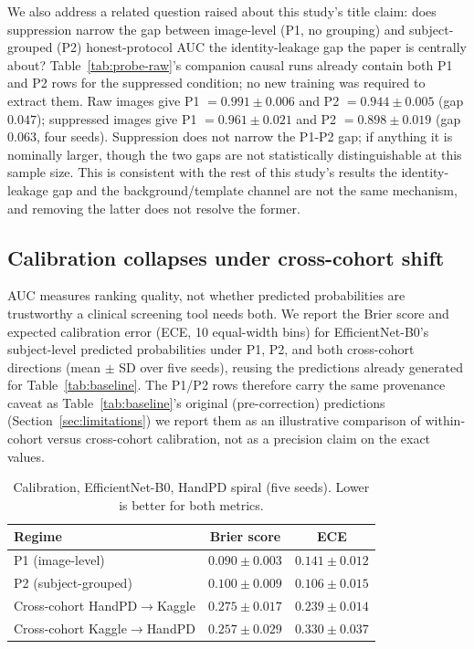 \documentclass[3p,final,10pt]{elsarticle}
\let\oldsubsection\subsection
\renewcommand{\subsection}{\FloatBarrier\oldsubsection}
\begin{document}
We also address a related question raised about this study's title claim:
does suppression narrow the gap between image-level (P1, no grouping) and
subject-grouped (P2) honest-protocol AUC the identity-leakage gap the
paper is centrally about? Table~\ref{tab:probe-raw}'s companion causal runs
already contain both P1 and P2 rows for the suppressed condition; no new
training was required to extract them. Raw images give P1 $=0.991\pm0.006$
and P2 $=0.944\pm0.005$ (gap $0.047$); suppressed images give P1
$=0.961\pm0.021$ and P2 $=0.898\pm0.019$ (gap $0.063$, four seeds).
Suppression does not narrow the P1-P2 gap; if anything it is nominally
larger, though the two gaps are not statistically distinguishable at this
sample size. This is consistent with the rest of this study's results the
identity-leakage gap and the background/template channel are not the same
mechanism, and removing the latter does not resolve the former.

\subsection{Calibration collapses under cross-cohort shift}
\label{sec:calibration}
AUC measures ranking quality, not whether predicted probabilities are
trustworthy a clinical screening tool needs both. We report the Brier
score and expected calibration error (ECE, 10 equal-width bins) for
EfficientNet-B0's subject-level predicted probabilities under P1, P2, and
both cross-cohort directions (mean $\pm$ SD over five seeds), reusing the
predictions already generated for Table~\ref{tab:baseline}. The P1/P2 rows
therefore carry the same provenance caveat as Table~\ref{tab:baseline}'s
original (pre-correction) predictions (Section~\ref{sec:limitations}) we
report them as an illustrative comparison of within-cohort versus
cross-cohort calibration, not as a precision claim on the exact values.

\begin{table}[H]
\centering
\caption{Calibration, EfficientNet-B0, HandPD spiral (five seeds). Lower
is better for both metrics.}
\label{tab:calibration}
\begin{tabular}{lcc}
\toprule
Regime & Brier score & ECE \\
\midrule
P1 (image-level)        & $0.090\pm0.003$ & $0.141\pm0.012$ \\
P2 (subject-grouped)    & $0.100\pm0.009$ & $0.106\pm0.015$ \\
Cross-cohort HandPD$\to$Kaggle & $0.275\pm0.017$ & $0.239\pm0.014$ \\
Cross-cohort Kaggle$\to$HandPD & $0.257\pm0.029$ & $0.330\pm0.037$ \\
\bottomrule
\end{tabular}
\end{table}
\end{document}
